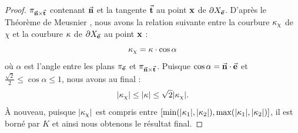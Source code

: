 \begin{proof}
  $\pi_{\vec{\mathbf{n}} \times \vec{\mathbf{t}}}$ contenant $\vec{\mathbf{n}}$ et la
  tangente $\vec{\mathbf{t}}$ au point $\mathbf{x}$ de $\partial X_{\vec{\mathbf{e}}}$. D'après le
  Théorème de Meusnier \cite{Berger1992}, nous avons la relation suivante entre la
  courbure $\kappa_\chi$ de $\chi$ et la courbure $\kappa$ de $\partial X_{\vec{\mathbf{e}}}$ au
  point $\mathbf{x}$ :
  \begin{equation}
    \kappa_\chi = \kappa \cdot \cos \alpha
  \end{equation}
  où $\alpha$ est l'angle entre les plans $\pi_{\vec{\mathbf{e}}}$ et
  $\pi_{\vec{\mathbf{n}} \times \vec{\mathbf{t}}}$. Puisque $\cos \alpha =
  \vec{\mathbf{n}} \cdot \vec{\mathbf{e}}$ et $\frac{\sqrt{2}}{2} \leq \cos \alpha \leq
  1 $, nous avons au final :
  \begin{equation}
    |\kappa_\chi| \le |\kappa| \le \sqrt{2}|\kappa_\chi|.
  \end{equation}
  À nouveau, puisque $|\kappa_\chi|$ est compris entre $\lbrack
  \min(|\kappa_{1}|,|\kappa_{2}|),
  \max(|\kappa_{1}|,|\kappa_{2}|)\rbrack$,  il est borné par $K$ et ainsi
  nous obtenons le résultat final.
\end{proof}


